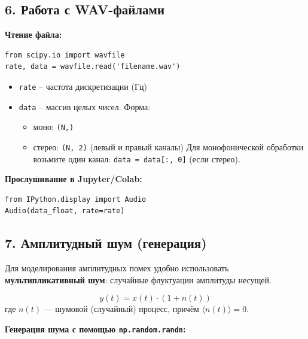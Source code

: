 \documentclass[12pt,a4paper,openany]{book}
\providecommand{\tightlist}{\setlength{\itemsep}{0pt}\setlength{\parskip}{0pt}}
\begin{document}
\subsection*{6. Работа с WAV-файлами}

\textbf{Чтение файла:}

\begin{Verbatim}[fontsize=\small, breaklines, breakanywhere]
from scipy.io import wavfile
rate, data = wavfile.read('filename.wav')
\end{Verbatim}

\begin{itemize}
\tightlist
\item
  \texttt{rate} -- частота дискретизации (Гц)
\item
  \texttt{data} -- массив целых чисел. Форма:

  \begin{itemize}
  \tightlist
  \item
    моно: \texttt{(\allowbreak{}N,\allowbreak{})}
  \item
    стерео: \texttt{(\allowbreak{}N,\allowbreak{}\ 2)} (левый и правый каналы)
    Для монофонической обработки возьмите один канал: \texttt{data\ =\allowbreak{}\ data{[}:\allowbreak{},\allowbreak{}\ 0{]}} (если стерео).
  \end{itemize}
\end{itemize}

\textbf{Прослушивание в Jupyter/Colab:}

\begin{Verbatim}[fontsize=\small, breaklines, breakanywhere]
from IPython.display import Audio
Audio(data_float, rate=rate)
\end{Verbatim}

\subsection*{7. Амплитудный шум (генерация)}

Для моделирования амплитудных помех удобно использовать \textbf{мультипликативный шум}: случайные флуктуации амплитуды несущей.

\[
y(t) = x(t) \cdot (1 + n(t))
\]
где \(n(t)\) --- шумовой (случайный) процесс, причём \(\langle n(t)\rangle = 0\).

\textbf{Генерация шума с помощью \texttt{np.\allowbreak{}random.\allowbreak{}randn}:}
\end{document}

